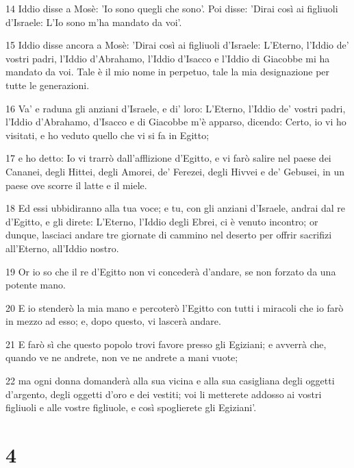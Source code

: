 \par 14 Iddio disse a Mosè: 'Io sono quegli che sono'. Poi disse: 'Dirai così ai figliuoli d'Israele: L'Io sono m'ha mandato da voi'.
\par 15 Iddio disse ancora a Mosè: 'Dirai così ai figliuoli d'Israele: L'Eterno, l'Iddio de' vostri padri, l'Iddio d'Abrahamo, l'Iddio d'Isacco e l'Iddio di Giacobbe mi ha mandato da voi. Tale è il mio nome in perpetuo, tale la mia designazione per tutte le generazioni.
\par 16 Va' e raduna gli anziani d'Israele, e di' loro: L'Eterno, l'Iddio de' vostri padri, l'Iddio d'Abrahamo, d'Isacco e di Giacobbe m'è apparso, dicendo: Certo, io vi ho visitati, e ho veduto quello che vi si fa in Egitto;
\par 17 e ho detto: Io vi trarrò dall'afflizione d'Egitto, e vi farò salire nel paese dei Cananei, degli Hittei, degli Amorei, de' Ferezei, degli Hivvei e de' Gebusei, in un paese ove scorre il latte e il miele.
\par 18 Ed essi ubbidiranno alla tua voce; e tu, con gli anziani d'Israele, andrai dal re d'Egitto, e gli direte: L'Eterno, l'Iddio degli Ebrei, ci è venuto incontro; or dunque, lasciaci andare tre giornate di cammino nel deserto per offrir sacrifizi all'Eterno, all'Iddio nostro.
\par 19 Or io so che il re d'Egitto non vi concederà d'andare, se non forzato da una potente mano.
\par 20 E io stenderò la mia mano e percoterò l'Egitto con tutti i miracoli che io farò in mezzo ad esso; e, dopo questo, vi lascerà andare.
\par 21 E farò sì che questo popolo trovi favore presso gli Egiziani; e avverrà che, quando ve ne andrete, non ve ne andrete a mani vuote;
\par 22 ma ogni donna domanderà alla sua vicina e alla sua casigliana degli oggetti d'argento, degli oggetti d'oro e dei vestiti; voi li metterete addosso ai vostri figliuoli e alle vostre figliuole, e così spoglierete gli Egiziani'.

\chapter{4}

